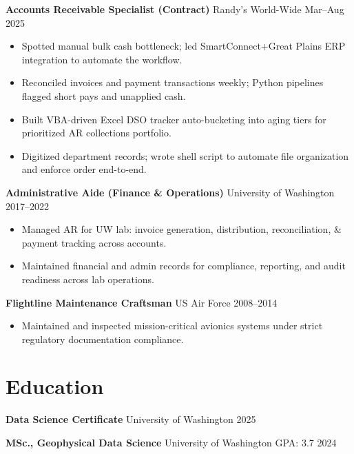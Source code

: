 \documentclass[11pt,a4paper]{article}
\begin{document}
\vspace{0.2cm}
\noindent
\textbf{Accounts Receivable Specialist (Contract)} \hfill Randy's World-Wide \hfill Mar--Aug 2025
\begin{itemize}
    \item Spotted manual bulk cash bottleneck; led SmartConnect+Great Plains ERP integration to automate the workflow.
    \item Reconciled invoices and payment transactions weekly; Python pipelines flagged short pays and unapplied cash.
    \item Built VBA-driven Excel DSO tracker auto-bucketing into aging tiers for prioritized AR collections portfolio.
    \item Digitized department records; wrote shell script to automate file organization and enforce order end-to-end.
\end{itemize}

\vspace{0.2cm}
\noindent
\textbf{Administrative Aide (Finance \& Operations)} \hfill University of Washington \hfill 2017--2022
\begin{itemize}
    \item Managed AR for UW lab: invoice generation, distribution, reconciliation, \& payment tracking across accounts.
    \item Maintained financial and admin records for compliance, reporting, and audit readiness across lab operations.
\end{itemize}

\vspace{0.2cm}
\noindent
\textbf{Flightline Maintenance Craftsman} \hfill US Air Force \hfill 2008--2014
\begin{itemize}
    \item Maintained and inspected mission-critical avionics systems under strict regulatory documentation compliance.
\end{itemize}

\section*{Education}

\noindent
\textbf{Data Science Certificate} \hfill University of Washington \hfill 2025

\vspace{0.1cm}
\noindent
\textbf{MSc., Geophysical Data Science} \hfill University of Washington \hfill GPA: 3.7 \hfill 2024
\end{document}
